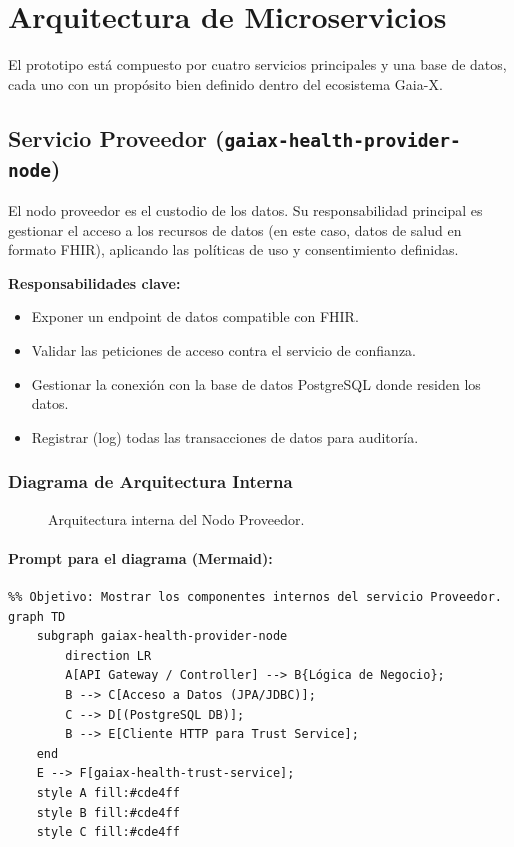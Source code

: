 \section{Arquitectura de Microservicios}

El prototipo está compuesto por cuatro servicios principales y una base de datos, cada uno con un propósito bien definido dentro del ecosistema Gaia-X.

\subsection{Servicio Proveedor (\texttt{gaiax-health-provider-node})}

El nodo proveedor es el custodio de los datos. Su responsabilidad principal es gestionar el acceso a los recursos de datos (en este caso, datos de salud en formato FHIR), aplicando las políticas de uso y consentimiento definidas.

\textbf{Responsabilidades clave:}
\begin{itemize}
    \item Exponer un endpoint de datos compatible con FHIR.
    \item Validar las peticiones de acceso contra el servicio de confianza.
    \item Gestionar la conexión con la base de datos PostgreSQL donde residen los datos.
    \item Registrar (log) todas las transacciones de datos para auditoría.
\end{itemize}

\subsubsection*{Diagrama de Arquitectura Interna}
\begin{figure}[H]
    \centering
    \caption{Arquitectura interna del Nodo Proveedor.}
    \label{fig:provider_arch}
\end{figure}

\paragraph{Prompt para el diagrama (Mermaid):}
\begin{verbatim}
%% Objetivo: Mostrar los componentes internos del servicio Proveedor.
graph TD
    subgraph gaiax-health-provider-node
        direction LR
        A[API Gateway / Controller] --> B{Lógica de Negocio};
        B --> C[Acceso a Datos (JPA/JDBC)];
        C --> D[(PostgreSQL DB)];
        B --> E[Cliente HTTP para Trust Service];
    end
    E --> F[gaiax-health-trust-service];
    style A fill:#cde4ff
    style B fill:#cde4ff
    style C fill:#cde4ff
\end{verbatim}

